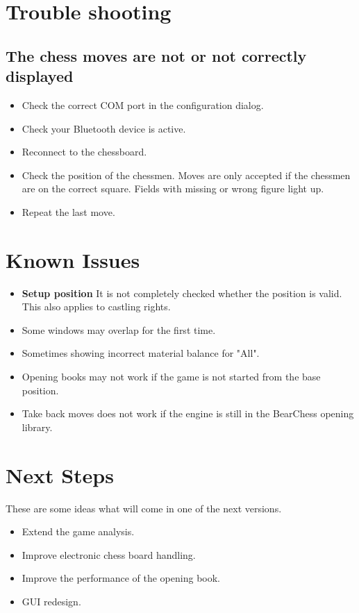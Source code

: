 \documentclass[11pt,a4paper]{article}
\begin{document}
\section{Trouble shooting}

\subsection{The chess moves are not or not correctly displayed}
\begin{itemize}
	\item Check the correct COM port in the configuration dialog.
	\item Check your Bluetooth device is active.	
	\item Reconnect to the chessboard.	
	\item Check the position of the chessmen. Moves are only accepted if the chessmen are on the correct square. Fields with missing or wrong figure light up.
	\item Repeat the last move.
\end{itemize}


\section{Known Issues}
\begin{itemize}
    \item \textbf{Setup position} It is not completely checked whether the position is valid. This also applies to castling rights.
	\item Some windows may overlap for the first time.
	\item Sometimes showing incorrect material balance for "All".
	\item Opening books may not work if the game is not started from the base position.	
	\item Take back moves does not work if the engine is still in the BearChess opening library.
\end{itemize}

\section{Next Steps}

These are some ideas what will come in one of the next versions.

\begin{itemize}
		\item Extend the game analysis.
		\item Improve electronic chess board handling.
  	    \item Improve the performance of the opening book.
   		\item GUI redesign.
	\end{itemize} 
\end{document}
